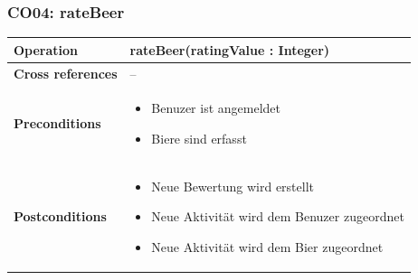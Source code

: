 \documentclass[10pt,a4paper]{scrartcl}
\begin{document}
\subsubsection{CO04: rateBeer}
\begin{tabular}{|l|p{}|}
\hline
 \textbf{Operation} & rateBeer(ratingValue : Integer) \\ 
\hline
\textbf{Cross references} & -- \\ 
\hline 
\textbf{Preconditions} & \begin{itemize}
							\item Benuzer ist angemeldet
							\item Biere sind erfasst 
						 \end{itemize}\\
\hline 
\textbf{Postconditions} & \begin{itemize}
							\item Neue Bewertung wird erstellt
							\item Neue Aktivität wird dem Benuzer zugeordnet
							\item Neue Aktivität wird dem Bier zugeordnet
						  \end{itemize} \\
\hline
\end{tabular}
\end{document}
